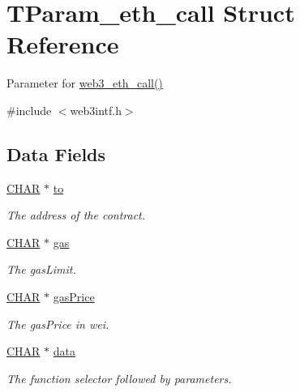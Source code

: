 \hypertarget{struct_t_param__eth__call}{}\section{T\+Param\+\_\+eth\+\_\+call Struct Reference}
\label{struct_t_param__eth__call}


Parameter for \mbox{\hyperlink{web3intf_8c_a7116548e501f02dd2d2cda471a1dae4f}{web3\+\_\+eth\+\_\+call()}}  




{\ttfamily \#include $<$web3intf.\+h$>$}

\subsection*{Data Fields}
\begin{DoxyCompactItemize}
\item 
\mbox{\hyperlink{boattypes_8h_aebb9e13210d88d43e32e735ada43a425}{C\+H\+AR}} $\ast$ \mbox{\hyperlink{struct_t_param__eth__call_addbf2c889591864d4b2334493e6a3041}{to}}
\begin{DoxyCompactList}\small\item\em The address of the contract. \end{DoxyCompactList}\item 
\mbox{\hyperlink{boattypes_8h_aebb9e13210d88d43e32e735ada43a425}{C\+H\+AR}} $\ast$ \mbox{\hyperlink{struct_t_param__eth__call_a25d821287fd941a396a9315dedd656e2}{gas}}
\begin{DoxyCompactList}\small\item\em The gas\+Limit. \end{DoxyCompactList}\item 
\mbox{\hyperlink{boattypes_8h_aebb9e13210d88d43e32e735ada43a425}{C\+H\+AR}} $\ast$ \mbox{\hyperlink{struct_t_param__eth__call_aa74af65d0e7285f25ccd9e7884194a93}{gas\+Price}}
\begin{DoxyCompactList}\small\item\em The gas\+Price in wei. \end{DoxyCompactList}\item 
\mbox{\hyperlink{boattypes_8h_aebb9e13210d88d43e32e735ada43a425}{C\+H\+AR}} $\ast$ \mbox{\hyperlink{struct_t_param__eth__call_a5e87342548dad4478a45acbbdfb7a9a5}{data}}
\begin{DoxyCompactList}\small\item\em The function selector followed by parameters. \end{DoxyCompactList}\end{DoxyCompactItemize}


